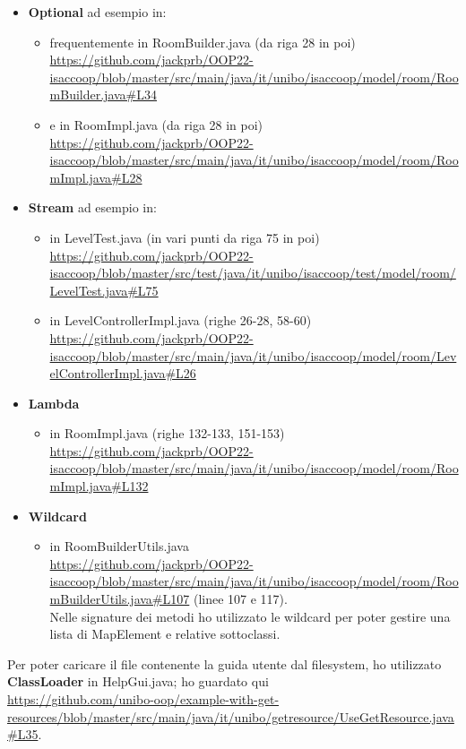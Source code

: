 \documentclass[a4paper,12pt]{report}
\begin{document}
\begin{itemize}
\item \textbf{Optional} ad esempio in:
    \begin{itemize}
        \item frequentemente in RoomBuilder.java (da riga 28 in poi) \url{https://github.com/jackprb/OOP22-isaccoop/blob/master/src/main/java/it/unibo/isaccoop/model/room/RoomBuilder.java#L34}
        \item e in RoomImpl.java (da riga 28 in poi) \url{https://github.com/jackprb/OOP22-isaccoop/blob/master/src/main/java/it/unibo/isaccoop/model/room/RoomImpl.java#L28}
    \end{itemize}
\item \textbf{Stream} ad esempio in:
    \begin{itemize}
        \item in LevelTest.java (in vari punti da riga 75 in poi) \url{https://github.com/jackprb/OOP22-isaccoop/blob/master/src/test/java/it/unibo/isaccoop/test/model/room/LevelTest.java#L75}
        \item in LevelControllerImpl.java (righe 26-28, 58-60) \url{https://github.com/jackprb/OOP22-isaccoop/blob/master/src/main/java/it/unibo/isaccoop/model/room/LevelControllerImpl.java#L26}
    \end{itemize}
\item \textbf{Lambda}
    \begin{itemize}
        \item in RoomImpl.java (righe 132-133, 151-153) \\\url{https://github.com/jackprb/OOP22-isaccoop/blob/master/src/main/java/it/unibo/isaccoop/model/room/RoomImpl.java#L132}
    \end{itemize}
\item \textbf{Wildcard}
    \begin{itemize}
        \item in RoomBuilderUtils.java
    \\\url{https://github.com/jackprb/OOP22-isaccoop/blob/master/src/main/java/it/unibo/isaccoop/model/room/RoomBuilderUtils.java#L107}
    (linee 107 e 117). \\Nelle signature dei metodi ho utilizzato le wildcard per poter gestire una lista di MapElement e relative sottoclassi.
    \end{itemize}
\end{itemize}

Per poter caricare il file contenente la guida utente dal filesystem, ho utilizzato \textbf{ClassLoader} in HelpGui.java; ho guardato qui
\\\url{https://github.com/unibo-oop/example-with-get-resources/blob/master/src/main/java/it/unibo/getresource/UseGetResource.java#L35}.
\end{document}
